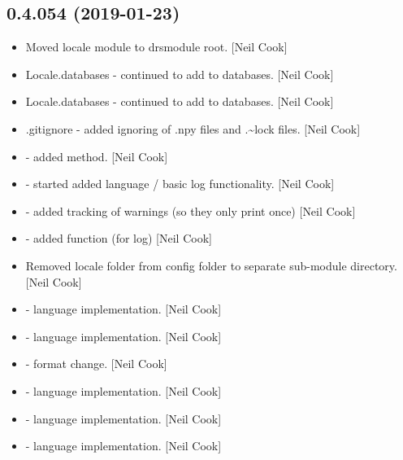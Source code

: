 \documentclass[a4paper,10pt,english]{report}
\begin{document}
\subsection{0.4.054 (2019-01-23)}
\label{\detokenize{misc/changelog:id210}}\begin{itemize}
\item {} 
Moved locale module to drsmodule root. {[}Neil Cook{]}

\item {} 
Locale.databases - continued to add to databases. {[}Neil Cook{]}

\item {} 
Locale.databases - continued to add to databases. {[}Neil Cook{]}

\item {} 
.gitignore - added ignoring of .npy files and .\textasciitilde{}lock files. {[}Neil
Cook{]}

\item {} 
 - added  method. {[}Neil
Cook{]}

\item {} 
 - started added language / basic log
functionality. {[}Neil Cook{]}

\item {} 
 - added tracking of warnings (so
they only print once) {[}Neil Cook{]}

\item {} 
 - added  function (for log) {[}Neil
Cook{]}

\item {} 
Removed locale folder from config folder to separate sub-module
directory. {[}Neil Cook{]}

\item {} 
 - language implementation.
{[}Neil Cook{]}

\item {} 
 - language implementation.
{[}Neil Cook{]}

\item {} 
 - format change. {[}Neil Cook{]}

\item {} 
 - language implementation. {[}Neil Cook{]}

\item {} 
 - language implementation. {[}Neil Cook{]}

\item {} 
 - language implementation. {[}Neil Cook{]}

\end{itemize}
\end{document}
